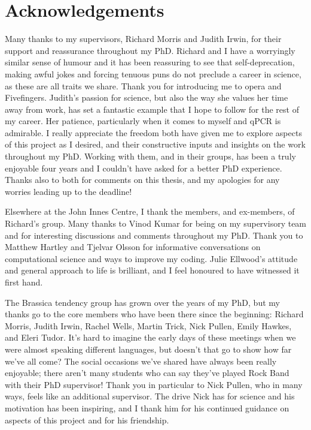 \documentclass[12pt,]{book}
\begin{document}
\chapter*{Acknowledgements}\label{acknowledgements}

Many thanks to my supervisors, Richard Morris and Judith Irwin, for
their support and reassurance throughout my PhD. Richard and I have a
worryingly similar sense of humour and it has been reassuring to see
that self-deprecation, making awful jokes and forcing tenuous puns do
not preclude a career in science, as these are all traits we share.
Thank you for introducing me to opera and Fivefingers. Judith's passion
for science, but also the way she values her time away from work, has
set a fantastic example that I hope to follow for the rest of my career.
Her patience, particularly when it comes to myself and qPCR is
admirable. I really appreciate the freedom both have given me to explore
aspects of this project as I desired, and their constructive inputs and
insights on the work throughout my PhD. Working with them, and in their
groups, has been a truly enjoyable four years and I couldn't have asked
for a better PhD experience. Thanks also to both for comments on this
thesis, and my apologies for any worries leading up to the deadline!

Elsewhere at the John Innes Centre, I thank the members, and ex-members,
of Richard's group. Many thanks to Vinod Kumar for being on my
supervisory team and for interesting discussions and comments throughout
my PhD. Thank you to Matthew Hartley and Tjelvar Olsson for informative
conversations on computational science and ways to improve my coding.
Julie Ellwood's attitude and general approach to life is brilliant, and
I feel honoured to have witnessed it first hand.

The Brassica tendency group has grown over the years of my PhD, but my
thanks go to the core members who have been there since the beginning:
Richard Morris, Judith Irwin, Rachel Wells, Martin Trick, Nick Pullen,
Emily Hawkes, and Eleri Tudor. It's hard to imagine the early days of
these meetings when we were almost speaking different languages, but
doesn't that go to show how far we've all come? The social occasions
we've shared have always been really enjoyable; there aren't many
students who can say they've played Rock Band with their PhD supervisor!
Thank you in particular to Nick Pullen, who in many ways, feels like an
additional supervisor. The drive Nick has for science and his motivation
has been inspiring, and I thank him for his continued guidance on
aspects of this project and for his friendship.
\end{document}
